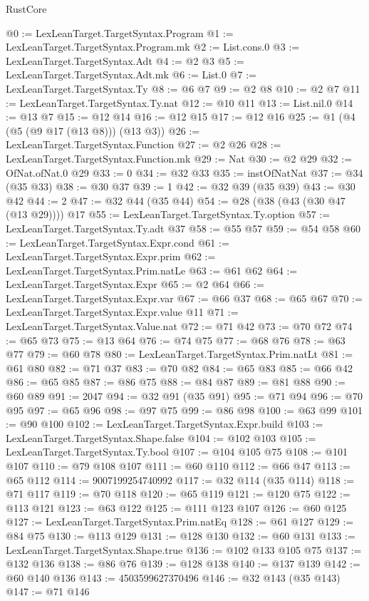 \begin{lexlean}{RustCore}
\begin{coremodule}
@0 := LexLeanTarget.TargetSyntax.Program
@1 := LexLeanTarget.TargetSyntax.Program.mk
@2 := List.cons.{0}
@3 := LexLeanTarget.TargetSyntax.Adt
@4 := @2 @3
@5 := LexLeanTarget.TargetSyntax.Adt.mk
@6 := List.{0}
@7 := LexLeanTarget.TargetSyntax.Ty
@8 := @6 @7
@9 := @2 @8
@10 := @2 @7
@11 := LexLeanTarget.TargetSyntax.Ty.nat
@12 := @10 @11
@13 := List.nil.{0}
@14 := @13 @7
@15 := @12 @14
@16 := @12 @15
@17 := @12 @16
@25 := @1 (@4 (@5 (@9 @17 (@13 @8))) (@13 @3))
@26 := LexLeanTarget.TargetSyntax.Function
@27 := @2 @26
@28 := LexLeanTarget.TargetSyntax.Function.mk
@29 := Nat
@30 := @2 @29
@32 := OfNat.ofNat.{0} @29
@33 := 0
@34 := @32 @33
@35 := instOfNatNat
@37 := @34 (@35 @33)
@38 := @30 @37
@39 := 1
@42 := @32 @39 (@35 @39)
@43 := @30 @42
@44 := 2
@47 := @32 @44 (@35 @44)
@54 := @28 (@38 (@43 (@30 @47 (@13 @29)))) @17
@55 := LexLeanTarget.TargetSyntax.Ty.option
@57 := LexLeanTarget.TargetSyntax.Ty.adt @37
@58 := @55 @57
@59 := @54 @58
@60 := LexLeanTarget.TargetSyntax.Expr.cond
@61 := LexLeanTarget.TargetSyntax.Expr.prim
@62 := LexLeanTarget.TargetSyntax.Prim.natLe
@63 := @61 @62
@64 := LexLeanTarget.TargetSyntax.Expr
@65 := @2 @64
@66 := LexLeanTarget.TargetSyntax.Expr.var
@67 := @66 @37
@68 := @65 @67
@70 := LexLeanTarget.TargetSyntax.Expr.value @11
@71 := LexLeanTarget.TargetSyntax.Value.nat
@72 := @71 @42
@73 := @70 @72
@74 := @65 @73
@75 := @13 @64
@76 := @74 @75
@77 := @68 @76
@78 := @63 @77
@79 := @60 @78
@80 := LexLeanTarget.TargetSyntax.Prim.natLt
@81 := @61 @80
@82 := @71 @37
@83 := @70 @82
@84 := @65 @83
@85 := @66 @42
@86 := @65 @85
@87 := @86 @75
@88 := @84 @87
@89 := @81 @88
@90 := @60 @89
@91 := 2047
@94 := @32 @91 (@35 @91)
@95 := @71 @94
@96 := @70 @95
@97 := @65 @96
@98 := @97 @75
@99 := @86 @98
@100 := @63 @99
@101 := @90 @100
@102 := LexLeanTarget.TargetSyntax.Expr.build
@103 := LexLeanTarget.TargetSyntax.Shape.false
@104 := @102 @103
@105 := LexLeanTarget.TargetSyntax.Ty.bool
@107 := @104 @105 @75
@108 := @101 @107
@110 := @79 @108 @107
@111 := @60 @110
@112 := @66 @47
@113 := @65 @112
@114 := 9007199254740992
@117 := @32 @114 (@35 @114)
@118 := @71 @117
@119 := @70 @118
@120 := @65 @119
@121 := @120 @75
@122 := @113 @121
@123 := @63 @122
@125 := @111 @123 @107
@126 := @60 @125
@127 := LexLeanTarget.TargetSyntax.Prim.natEq
@128 := @61 @127
@129 := @84 @75
@130 := @113 @129
@131 := @128 @130
@132 := @60 @131
@133 := LexLeanTarget.TargetSyntax.Shape.true
@136 := @102 @133 @105 @75
@137 := @132 @136
@138 := @86 @76
@139 := @128 @138
@140 := @137 @139
@142 := @60 @140 @136
@143 := 4503599627370496
@146 := @32 @143 (@35 @143)
@147 := @71 @146

\end{coremodule}
\end{lexlean}
